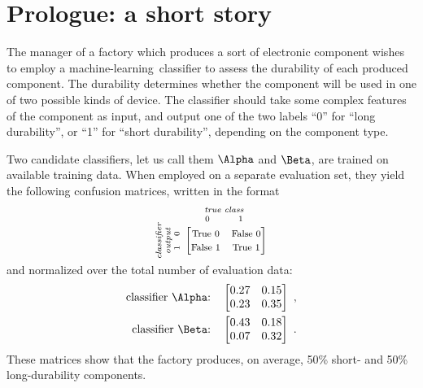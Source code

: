 \documentclass[\ifafour a4paper,12pt,\else a5paper,10pt,\fi%
onecolumn,oneside,article,%
british%
]{memoir}
\theoremstyle{remark}
\theoremstyle{innote}
\renewcommand*{\|}[1][]{\nonscript\:#1\vert\nonscript\:\mathopen{}}
\newcommand*{\ml}{machine-learning}
\begin{document}
\setcounter{section}{-1}

\section{Prologue: a short story}
\label{sec:intro}

The manager of a factory which produces a sort of electronic component wishes to employ a \ml\ classifier to assess the durability of each produced component. The durability determines whether the component will be used in one of two possible kinds of device. The classifier should take some complex features of the component as input, and output one of the two labels \enquote{0} for \enquote{long durability}, or \enquote{1} for \enquote{short durability}, depending on the component type.

Two candidate classifiers, let us call them $\Alpha$ and $\Beta$, are trained on available training data. When employed on a separate evaluation set, they yield the following confusion matrices, written in the format
\begin{equation*}
  \rotatebox[origin=c]{90}{
    \clap{\textit{\parbox{5em}{\centering\scriptsize classifier\\output\\$1\quad 0$}}
    }}\ 
    \overbracket[0pt]{
      \begin{bmatrix}
    \text{\footnotesize True 0} & \text{\footnotesize False 0}\\
    \text{\footnotesize False 1} & \text{\footnotesize True 1}\\
      \end{bmatrix}}^{
      \clap{\textit{\parbox{6em}{\centering\scriptsize true class\\$0\hspace{3em}1$}}
    }}
\end{equation*}
and normalized over the total number of evaluation data:
\begin{align}
  \label{eq:CM_A}
\text{classifier $\Alpha$:}\quad  \begin{bmatrix}
    0.27 & 0.15 \\ 0.23 & 0.35
  \end{bmatrix}
\ ,
  \\
  \label{eq:CM_B}
\text{classifier $\Beta$:}\quad  \begin{bmatrix}
    0.43 & 0.18 \\ 0.07 & 0.32
  \end{bmatrix}
\ .
\end{align}
These matrices show that the factory produces, on average, 50\% short- and 50\% long-durability components.
\end{document}
